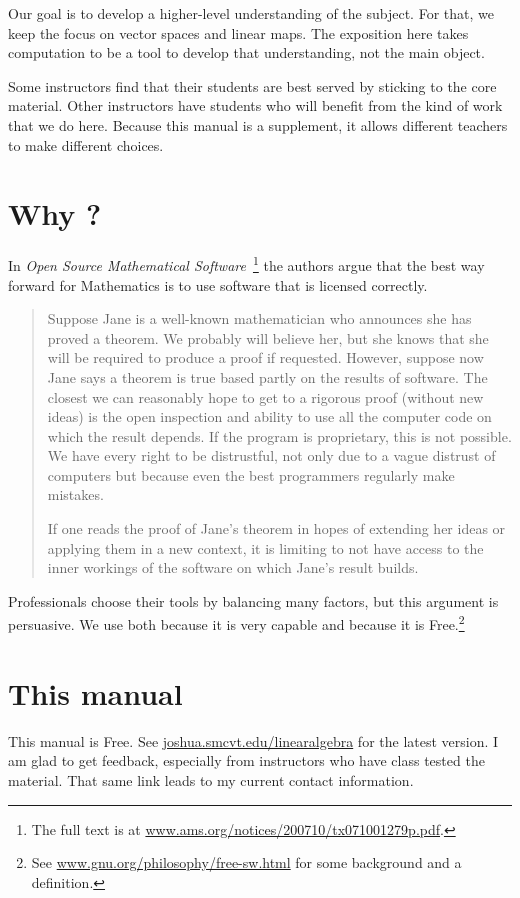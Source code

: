 Our goal is to develop a higher-level understanding of the subject. 
For that, we keep the focus on vector spaces and linear maps.
The exposition here takes computation to be
a tool to develop that understanding, not the main object.

Some instructors find that their students are best served by
sticking to the
core material.
Other instructors
have students who will benefit from the kind of work that
we do here.
Because this manual is a supplement, it allows different 
teachers to make different choices.


\section{Why \Sage?}
In 
\textit{Open Source Mathematical Software\,} 
\citep{JoynerStein07}\footnote{The full text is at
\protect\url{www.ams.org/notices/200710/tx071001279p.pdf}.}
the authors argue that the best way forward for Mathematics 
is to use software that is licensed correctly.

\begin{quotation}\small
Suppose Jane is a well-known mathematician who announces
she has proved a theorem. We probably will believe
her, but she knows that she will be required to produce
a proof if requested. However, suppose now Jane says a
theorem is true based partly on the results of software. The
closest we can reasonably hope to get to a rigorous proof
(without new ideas) is the open inspection and ability to use
all the computer code on which the result depends. If the
program is proprietary, this is not possible. We have every
right to be distrustful, not only due to a vague distrust of
computers but because even the best programmers regularly
make mistakes.

If one reads the proof of Jane’s theorem in hopes of
extending her ideas or applying them in a new context, it
is limiting to not have access to the inner workings of the
software on which Jane’s result builds.
\end{quotation}  
Professionals choose their tools by balancing many factors, but
this argument is persuasive.
We use \Sage{} both because it is very capable 
and because it is 
Free.\footnote{See
\protect\url{www.gnu.org/philosophy/free-sw.html} 
for some background and a definition.} 



\section{This manual}
This manual is Free.
See
\url{joshua.smcvt.edu/linearalgebra} for the latest version. 
I am glad to get feedback, especially from instructors
who have class tested the material.
That same link leads to my current contact information.

